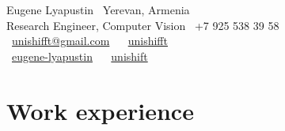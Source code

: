 \documentclass{tccv}
\begin{document}
{ Eugene Lyapustin} \hfill \faMapMarker~Yerevan, Armenia \\
{\Large Research Engineer, Computer Vision} \hfill \faPhone~+7 925 538 39 58 \\
\null \hfill \faEnvelope~\href{mailto:unishifft@gmail.com}{unishifft@gmail.com} ~ \faTelegramPlane~\href{https://t.me/unishifft}{unishifft}\\
\null\hfill \faLinkedin~\href{https://linkedin.com/in/eugene-lyapustin}{eugene-lyapustin} ~ \faGithub~\href{https://github.com/unishift/}{unishift}



\section{Work experience}
\end{document}
